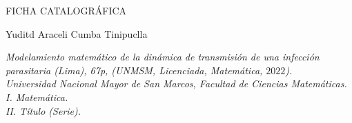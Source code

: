 \newpage
\begin{titlepage}

\begin{center}
{\sc \large FICHA CATALOGR\'AFICA}
\end{center}

\vspace*{9cm}

{\renewcommand{\baselinestretch}{1.2}\normalsize\small

\begin{flushright}
\begin{minipage}{10cm}
\begin{flushright}
{\sc Yuditd Araceli Cumba Tinipuclla}
\end{flushright}
\textit{Modelamiento matemático de la dinámica de transmisión de una infección parasitaria (Lima), 67p, (UNMSM, Licenciada, Matem\'atica, $2022$).\\ Universidad Nacional Mayor de San Marcos, Facultad de Ciencias Matem\'aticas.\\ 
I. Matemática.\\
II. Título (Serie).}

\end{minipage}
\end{flushright}}

\end{titlepage}
\newpage
